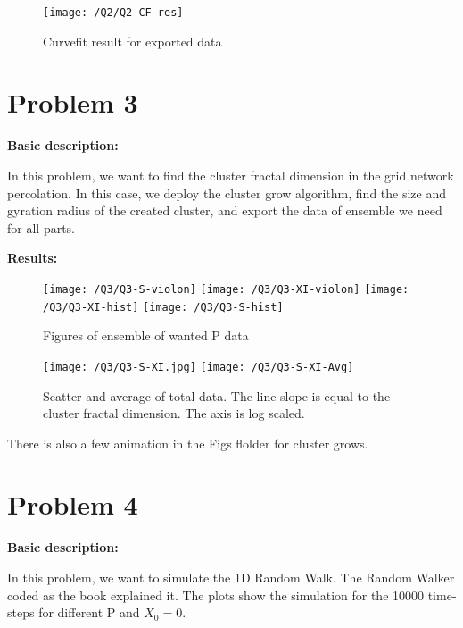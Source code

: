 \documentclass{article}
\begin{document}
    \begin{figure}[!htb]
        \centering
        \texttt{[image: /Q2/Q2-CF-res]}
        \label{fig:2.2}
        \caption{Curvefit result for exported data}
    \end{figure}
    
    \section*{Problem 3}
    \textbf{Basic description:}

    In this problem, we want to find the cluster fractal dimension in the grid network percolation.
    In this case, we deploy the cluster grow algorithm,
    find the size and gyration radius of the created cluster,
    and export the data of ensemble we need for all parts.

    \textbf{Results:}

    \begin{figure}[!htb]
        \centering
        \texttt{[image: /Q3/Q3-S-violon]}
        \label{fig:3.1}
        \texttt{[image: /Q3/Q3-XI-violon]}
        \label{fig:3.2}
        \texttt{[image: /Q3/Q3-XI-hist]}
        \label{fig:3.3}
        \texttt{[image: /Q3/Q3-S-hist]}
        \label{fig:3.4}
        \caption{Figures of ensemble of wanted P data}
    \end{figure}
        
    \begin{figure}[!htb]
        \centering
        \texttt{[image: /Q3/Q3-S-XI.jpg]}
        \label{fig:3.5}
        \texttt{[image: /Q3/Q3-S-XI-Avg]}
        \label{fig:3.6}
        \caption{Scatter and average of total data. The line slope is equal to the cluster fractal dimension.
        The axis is log scaled.}
    \end{figure}

    There is also a few animation in the Figs flolder for cluster grows.

    \section*{Problem 4}
    \textbf{Basic description:}

    In this problem, we want to simulate the 1D Random Walk.
    The Random Walker coded as the book explained it.
    The plots show the simulation for the 10000 time-steps for different P and $X_0 = 0$.
    
\end{document}
